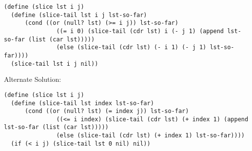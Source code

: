 \begin{blocksection}
\begin{solution}
\begin{lstlisting}
(define (slice lst i j)
  (define (slice-tail lst i j lst-so-far)
      (cond ((or (null? lst) (>= i j)) lst-so-far)
               ((= i 0) (slice-tail (cdr lst) i (- j 1) (append lst-so-far (list (car lst)))))
               (else (slice-tail (cdr lst) (- i 1) (- j 1) lst-so-far))))
  (slice-tail lst i j nil))
\end{lstlisting}
Alternate Solution:
\begin{lstlisting}
(define (slice lst i j)
  (define (slice-tail lst index lst-so-far)
      (cond ((or (null? lst) (= index j)) lst-so-far)
               ((<= i index) (slice-tail (cdr lst) (+ index 1) (append lst-so-far (list (car lst)))))
               (else (slice-tail (cdr lst) (+ index 1) lst-so-far))))
  (if (< i j) (slice-tail lst 0 nil) nil))
\end{lstlisting}
\end{solution}

\end{blocksection}